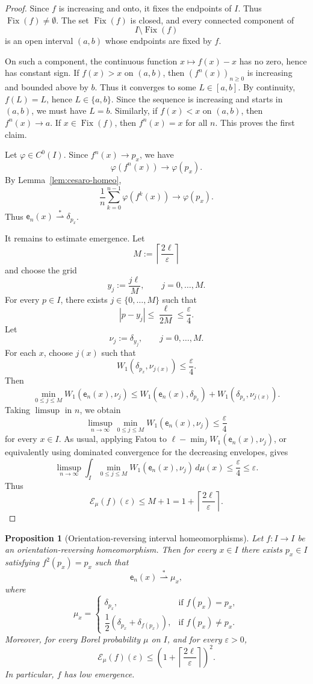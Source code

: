 \documentclass[12pt,a4paper,twoside]{article}
\theoremstyle{plain}
\newtheorem{proposition}[theorem]{Proposition}
\theoremstyle{definition}
\newcommand{\cE}{{\mathcal E}}
\newcommand{\emp}{\mathsf e}
\newcommand{\wto}{\overset{*}{\rightharpoonup}}
\begin{document}
\begin{proof}
Since \(f\) is increasing and onto, it fixes the endpoints of \(I\). Thus
\(\operatorname{Fix}(f)\neq\emptyset\). The set \(\operatorname{Fix}(f)\)
is closed, and every connected component of
\[
I\setminus \operatorname{Fix}(f)
\]
is an open interval \((a,b)\) whose endpoints are fixed by \(f\).

On such a component, the continuous function \(x\mapsto f(x)-x\) has no
zero, hence has constant sign. If \(f(x)>x\) on \((a,b)\), then
\((f^n(x))_{n\ge0}\) is increasing and bounded above by \(b\). Thus it
converges to some \(L\in[a,b]\). By continuity, \(f(L)=L\), hence
\(L\in\{a,b\}\). Since the sequence is increasing and starts in \((a,b)\),
we must have \(L=b\). Similarly, if \(f(x)<x\) on \((a,b)\), then
\(f^n(x)\to a\). If \(x\in\operatorname{Fix}(f)\), then \(f^n(x)=x\) for
all \(n\). This proves the first claim.

Let \(\varphi\in C^0(I)\). Since \(f^n(x)\to p_x\), we have
\[
\varphi(f^n(x))\to \varphi(p_x).
\]
By Lemma~\ref{lem:cesaro-homeo},
\[
\frac1n\sum_{k=0}^{n-1}\varphi(f^k(x))
\longrightarrow
\varphi(p_x).
\]
Thus \(\emp_n(x)\wto\delta_{p_x}\).

It remains to estimate emergence. Let
\[
M:=\left\lceil\frac{2\ell}{\varepsilon}\right\rceil
\]
and choose the grid
\[
y_j:=\frac{j\ell}{M},
\qquad j=0,\dots,M.
\]
For every \(p\in I\), there exists \(j\in\{0,\dots,M\}\) such that
\[
|p-y_j|\le \frac{\ell}{2M}\le\frac{\varepsilon}{4}.
\]
Let
\[
\nu_j:=\delta_{y_j},
\qquad j=0,\dots,M.
\]
For each \(x\), choose \(j(x)\) such that
\[
W_1(\delta_{p_x},\nu_{j(x)})\le \frac{\varepsilon}{4}.
\]
Then
\[
\min_{0\le j\le M}W_1(\emp_n(x),\nu_j)
\le
W_1(\emp_n(x),\delta_{p_x})
+
W_1(\delta_{p_x},\nu_{j(x)}).
\]
Taking \(\limsup\) in \(n\), we obtain
\[
\limsup_{n\to\infty}
\min_{0\le j\le M}W_1(\emp_n(x),\nu_j)
\le
\frac{\varepsilon}{4}
\]
for every \(x\in I\). As usual, applying Fatou to
\(\ell-\min_j W_1(\emp_n(x),\nu_j)\), or equivalently using dominated
convergence for the decreasing envelopes, gives
\[
\limsup_{n\to\infty}
\int_I
\min_{0\le j\le M}W_1(\emp_n(x),\nu_j)\,d\mu(x)
\le
\frac{\varepsilon}{4}
\le \varepsilon.
\]
Thus
\[
\cE_\mu(f)(\varepsilon)
\le M+1
=
1+\left\lceil\frac{2\ell}{\varepsilon}\right\rceil .
\]
\end{proof}

\begin{proposition}[Orientation-reversing interval homeomorphisms]
\label{prop:interval-reversing-homeo}
Let \(f:I\to I\) be an orientation-reversing homeomorphism. Then for every
\(x\in I\) there exists \(p_x\in I\) satisfying \(f^2(p_x)=p_x\) such that
\[
\emp_n(x)\wto \mu_x,
\]
where
\[
\mu_x=
\begin{cases}
\delta_{p_x}, & \text{if }f(p_x)=p_x,\\[0.3em]
\dfrac12(\delta_{p_x}+\delta_{f(p_x)}),
& \text{if }f(p_x)\neq p_x.
\end{cases}
\]
Moreover, for every Borel probability \(\mu\) on \(I\), and for every
\(\varepsilon>0\),
\[
\cE_\mu(f)(\varepsilon)
\le
\left(1+\left\lceil\frac{2\ell}{\varepsilon}\right\rceil\right)^2.
\]
In particular, \(f\) has low emergence.
\end{proposition}
\end{document}
